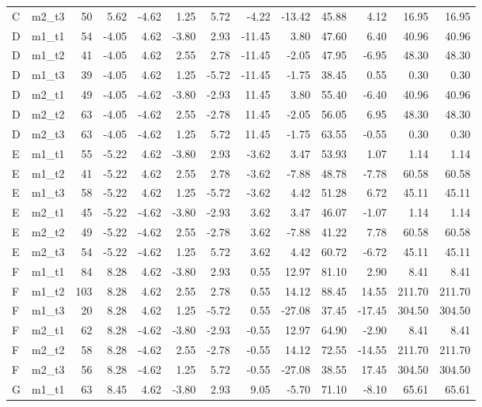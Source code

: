 \documentclass{ltjbook}
\begin{document}
\begin{table}[p]
\begin{tabular}{llrrrrrrrrrrr}
C & m2\_t3 & 50 & 5.62 & -4.62 & 1.25 & 5.72 & -4.22 & -13.42 & 45.88 & 4.12 & 16.95 & 16.95 \\
D & m1\_t1 & 54 & -4.05 & 4.62 & -3.80 & 2.93 & -11.45 & 3.80 & 47.60 & 6.40 & 40.96 & 40.96 \\
D & m1\_t2 & 41 & -4.05 & 4.62 & 2.55 & 2.78 & -11.45 & -2.05 & 47.95 & -6.95 & 48.30 & 48.30 \\
D & m1\_t3 & 39 & -4.05 & 4.62 & 1.25 & -5.72 & -11.45 & -1.75 & 38.45 & 0.55 & 0.30 & 0.30 \\
D & m2\_t1 & 49 & -4.05 & -4.62 & -3.80 & -2.93 & 11.45 & 3.80 & 55.40 & -6.40 & 40.96 & 40.96 \\
D & m2\_t2 & 63 & -4.05 & -4.62 & 2.55 & -2.78 & 11.45 & -2.05 & 56.05 & 6.95 & 48.30 & 48.30 \\
D & m2\_t3 & 63 & -4.05 & -4.62 & 1.25 & 5.72 & 11.45 & -1.75 & 63.55 & -0.55 & 0.30 & 0.30 \\
E & m1\_t1 & 55 & -5.22 & 4.62 & -3.80 & 2.93 & -3.62 & 3.47 & 53.93 & 1.07 & 1.14 & 1.14 \\
E & m1\_t2 & 41 & -5.22 & 4.62 & 2.55 & 2.78 & -3.62 & -7.88 & 48.78 & -7.78 & 60.58 & 60.58 \\
E & m1\_t3 & 58 & -5.22 & 4.62 & 1.25 & -5.72 & -3.62 & 4.42 & 51.28 & 6.72 & 45.11 & 45.11 \\
E & m2\_t1 & 45 & -5.22 & -4.62 & -3.80 & -2.93 & 3.62 & 3.47 & 46.07 & -1.07 & 1.14 & 1.14 \\
E & m2\_t2 & 49 & -5.22 & -4.62 & 2.55 & -2.78 & 3.62 & -7.88 & 41.22 & 7.78 & 60.58 & 60.58 \\
E & m2\_t3 & 54 & -5.22 & -4.62 & 1.25 & 5.72 & 3.62 & 4.42 & 60.72 & -6.72 & 45.11 & 45.11 \\
F & m1\_t1 & 84 & 8.28 & 4.62 & -3.80 & 2.93 & 0.55 & 12.97 & 81.10 & 2.90 & 8.41 & 8.41 \\
F & m1\_t2 & 103 & 8.28 & 4.62 & 2.55 & 2.78 & 0.55 & 14.12 & 88.45 & 14.55 & 211.70 & 211.70 \\
F & m1\_t3 & 20 & 8.28 & 4.62 & 1.25 & -5.72 & 0.55 & -27.08 & 37.45 & -17.45 & 304.50 & 304.50 \\
F & m2\_t1 & 62 & 8.28 & -4.62 & -3.80 & -2.93 & -0.55 & 12.97 & 64.90 & -2.90 & 8.41 & 8.41 \\
F & m2\_t2 & 58 & 8.28 & -4.62 & 2.55 & -2.78 & -0.55 & 14.12 & 72.55 & -14.55 & 211.70 & 211.70 \\
F & m2\_t3 & 56 & 8.28 & -4.62 & 1.25 & 5.72 & -0.55 & -27.08 & 38.55 & 17.45 & 304.50 & 304.50 \\
G & m1\_t1 & 63 & 8.45 & 4.62 & -3.80 & 2.93 & 9.05 & -5.70 & 71.10 & -8.10 & 65.61 & 65.61 \\

\end{tabular}
\end{table}
\end{document}
